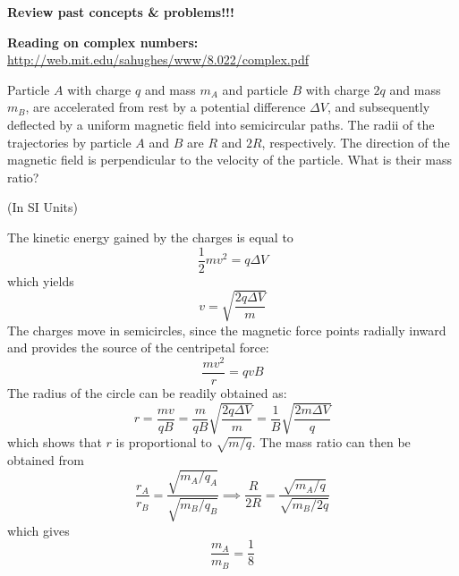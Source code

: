 \documentclass[makesolutionspdf]{esg8022pset}
\begin{document}
\begin{ForPSet}
  \noindent \textbf{Review past concepts \& problems!!!}

  \noindent \textbf{Reading on complex numbers:} \url{http://web.mit.edu/sahughes/www/8.022/complex.pdf}
\end{ForPSet}

\begin{problem}{}
  Particle $A$ with charge $q$ and mass $m_A$ and particle $B$ with charge $2q$ and mass $m_B$, are accelerated from rest by a potential difference $\Delta V$, and subsequently deflected by a uniform magnetic field into semicircular paths. The radii of the trajectories by particle $A$ and $B$ are $R$ and $2R$, respectively. The direction of the magnetic field is perpendicular to the velocity of the particle. What is their mass ratio?
\end{problem}
\begin{solution}
  (In SI Units)

  The kinetic energy gained by the charges is equal to 
  $$\frac12 mv^2 = q\Delta V$$
  which yields
  $$v = \sqrt{\frac{2q \Delta V}{m}}$$
  The charges move in semicircles, since the magnetic force points radially inward and provides the source of the centripetal force:
  $$\frac{mv^2}{r} = qvB$$
  The radius of the circle can be readily obtained as:
  $$r = \frac{mv}{qB} = \frac{m}{qB}\sqrt{\frac{2q\Delta V}{m}} = \frac{1}{B}\sqrt{\frac{2m\Delta V}{q}}$$
  which shows that $r$ is proportional to $\sqrt{m/q}$. The mass ratio can then be obtained from
  $$\frac{r_A}{r_B} = \frac{\sqrt{m_A / q_A}}{\sqrt{m_B / q_B}} \implies \frac{R}{2R} = \frac{\sqrt{m_A / q}}{\sqrt{m_B / 2q}}$$
  which gives
  $$\frac{m_A}{m_B} = \frac18$$
\end{solution}
\end{document}
